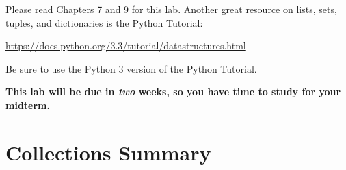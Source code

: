 \documentclass[11pt]{cselabheader}
\begin{document}
Please read Chapters 7 and 9 for this lab. Another great resource on lists,
sets, tuples, and dictionaries is the Python Tutorial:
\begin{center}
  \url{https://docs.python.org/3.3/tutorial/datastructures.html}
\end{center}
Be sure to use the Python 3 version of the Python Tutorial.

\textbf{This lab will be due in \emph{two} weeks, so you have time to study for your
midterm.}

%
%
%
%

\pagebreak
\section{Collections Summary}
\end{document}
